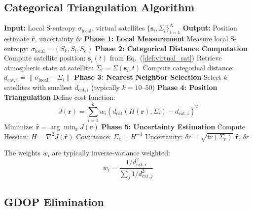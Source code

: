 \documentclass[twocolumn,10pt,a4paper]{article}
\theoremstyle{definition}
\theoremstyle{remark}
\newcommand{\dcat}{d_{\mathrm{cat}}}
\begin{document}
\subsection{Categorical Triangulation Algorithm}

\begin{algorithm}[H]
\caption{Categorical GPS Position Determination}
\label{alg:cat_gps}
\begin{algorithmic}[1]
\STATE \textbf{Input:} Local S-entropy $\sigma_{\text{local}}$, virtual satellites $\{\mathbf{s}_i, \Sigma_i\}_{i=1}^N$
\STATE \textbf{Output:} Position estimate $\hat{\mathbf{r}}$, uncertainty $\delta r$
\STATE
\STATE \textbf{Phase 1: Local Measurement}
\STATE Measure local S-entropy: $\sigma_{\text{local}} = (S_k, S_t, S_e)$
\STATE
\STATE \textbf{Phase 2: Categorical Distance Computation}
    \STATE Compute satellite position: $\mathbf{s}_i(t)$ from Eq.~(\ref{def:virtual_sat})
    \STATE Retrieve atmospheric state at satellite: $\Sigma_i = \Sigma(\mathbf{s}_i, t)$
    \STATE Compute categorical distance: $d_{\text{cat},i} = \|\sigma_{\text{local}} - \Sigma_i\|$
\ENDFOR
\STATE
\STATE \textbf{Phase 3: Nearest Neighbor Selection}
\STATE Select $k$ satellites with smallest $d_{\text{cat},i}$ (typically $k = 10$--$50$)
\STATE
\STATE \textbf{Phase 4: Position Triangulation}
\STATE Define cost function:
\begin{equation}
    J(\mathbf{r}) = \sum_{i=1}^k w_i \left(\dcat(\Pi(\mathbf{r}), \Sigma_i) - d_{\text{cat},i}\right)^2
\end{equation}
\STATE Minimize: $\hat{\mathbf{r}} = \arg\min_{\mathbf{r}} J(\mathbf{r})$
\STATE
\STATE \textbf{Phase 5: Uncertainty Estimation}
\STATE Compute Hessian: $H = \nabla^2 J(\hat{\mathbf{r}})$
\STATE Covariance: $\Sigma_r = H^{-1}$
\STATE Uncertainty: $\delta r = \sqrt{\text{tr}(\Sigma_r)}$
\STATE
\RETURN $\hat{\mathbf{r}}$, $\delta r$
\end{algorithmic}
\end{algorithm}

The weights $w_i$ are typically inverse-variance weighted:
\begin{equation}
    w_i = \frac{1/d_{\text{cat},i}^2}{\sum_j 1/d_{\text{cat},j}^2}
\end{equation}

\subsection{GDOP Elimination}
\end{document}
